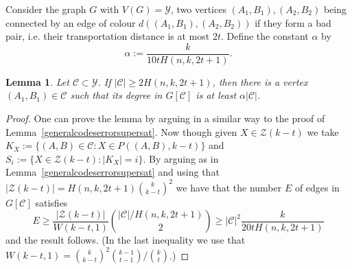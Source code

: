 \documentclass[11pt]{article}
\newtheorem{lemma}[theorem]{Lemma}
\numberwithin{equation}{section}
\begin{document}


Consider the graph $G$ with $V(G)=\mathcal{Y}$, two vertices $(A_1,B_1),(A_2,B_2) $ being connected by an edge of colour $d((A_1,B_1),(A_2,B_2) )$ if they form a bad pair, i.e. their transportation distance is at most $2t$. Define the constant $\alpha$ by $$\alpha :=\frac{k}{10tH(n,k,2t+1)}.$$


\begin{lemma}\label{cont2}
Let $\mathcal{C}\subset \mathcal{Y}$. If $|\mathcal{C}|\geq 2H(n,k,2t+1)$, then there is a vertex $(A_1,B_1)\in\mathcal{C}$ such that its degree in $G[\mathcal{C}]$ is at least $\alpha |\mathcal{C}|$.
\end{lemma}
\begin{proof}
One can prove the lemma by arguing in a similar way to the proof of Lemma~\ref{generalcodeserrorsupersat}. Now though given $X \in \mathcal Z(k-t)$ we take $K_X:=\{(A,B) \in \mathcal C : X \in P((A,B), k-t)\}$
and $S_i:= \{X  \in \mathcal Z(k-t): |K_X|=i\}$. By arguing  as in Lemma~\ref{generalcodeserrorsupersat} and using that $|\mathcal{Z}(k-t)|=H(n,k,2t+1)\binom{k}{k-t}^2$
we have that the number $E$ of edges in $G[\mathcal{C}]$ satisfies
$$E\geq \frac{|\mathcal{Z}(k-t)|}{W(k-t,1)} \binom{|\mathcal{C}|/H(n,k,2t+1)}{2}\geq |\mathcal{C}|^2\frac{k}{20tH(n,k,2t+1)}$$ and the result follows.
(In the last inequality we use that  $W(k-t,1)=\binom{k}{k-t}^2 \binom{k-1}{t-1}/\binom{k}{t}$.)
\end{proof}
\end{document}
